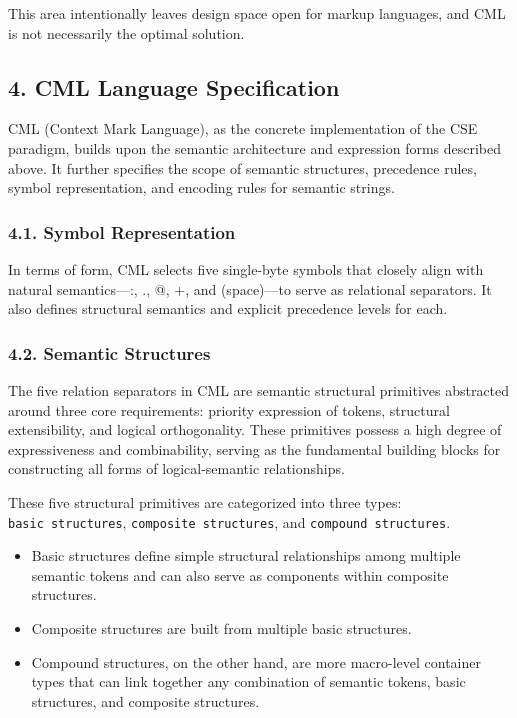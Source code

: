 \documentclass[conference]{IEEEtran}
\begin{document}
This area intentionally leaves design space open for markup languages,
and CML is not necessarily the optimal solution.

\subsection{4. CML Language
Specification}\label{4-cml-language-specification}

CML (Context Mark Language), as the concrete implementation of the CSE
paradigm, builds upon the semantic architecture and expression forms
described above. It further specifies the scope of semantic structures,
precedence rules, symbol representation, and encoding rules for semantic
strings.

\subsubsection{4.1. Symbol
Representation}\label{41-symbol-representation}

In terms of form, CML selects five single-byte symbols that closely
align with natural semantics---:, ., @, +, and (space)---to serve as
relational separators. It also defines structural semantics and explicit
precedence levels for each.

\subsubsection{4.2. Semantic Structures}\label{42-semantic-structures}

The five relation separators in CML are semantic structural primitives
abstracted around three core requirements: priority expression of
tokens, structural extensibility, and logical orthogonality. These
primitives possess a high degree of expressiveness and combinability,
serving as the fundamental building blocks for constructing all forms of
logical-semantic relationships.

These five structural primitives are categorized into three types:
\texttt{basic\ structures}, \texttt{composite\ structures}, and
\texttt{compound\ structures}.

\begin{itemize}
\item
  Basic structures define simple structural relationships among multiple
  semantic tokens and can also serve as components within composite
  structures.
\item
  Composite structures are built from multiple basic structures.
\item
  Compound structures, on the other hand, are more macro-level container
  types that can link together any combination of semantic tokens, basic
  structures, and composite structures.
\end{itemize}
\end{document}
